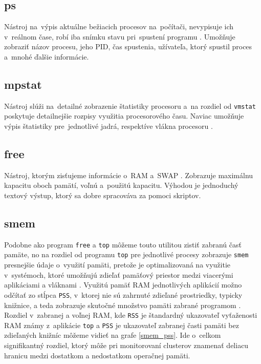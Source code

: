 \subsection*{ps}
Nástroj na~výpis aktuálne bežiacich procesov na~počítači, nevypisuje ich v~reálnom čase, robí iba snímku stavu pri~spustení programu \cite{performance-monitor-book}. Umožňuje zobraziť názov procesu, jeho PID, čas spustenia, užívateľa, ktorý spustil proces a~mnohé ďalšie informácie.

\subsection*{mpstat}
Nástroj slúži na~detailné zobrazenie štatistiky procesoru a~na rozdiel od \texttt{vmstat} poskytuje detailnejšie rozpisy využitia procesorového času. Naviac umožňuje výpis štatistiky pre~jednotlivé jadrá, respektíve vlákna procesoru \cite{text-utils-book}.

\subsection*{free}
Nástroj, ktorým zisťujeme informácie o~RAM a~SWAP \cite{performance-monitor-book}. Zobrazuje maximálnu kapacitu oboch pamätí, voľnú a~použitú kapacitu. Výhodou je jednoduchý textový výstup, ktorý sa dobre spracováva za pomoci skriptov.

\subsection*{smem}
Podobne ako program \texttt{free} a \texttt{top} môžeme touto utilitou zistiť zabranú časť pamäte, no na rozdiel od programu \texttt{top} pre jednotlivé procesy zobrazuje \texttt{smem} presnejšie údaje o~využití pamäti, pretože je optimalizovaná na využitie v~systémoch, ktoré umožňujú zdieľať pamäťový priestor medzi viacerými aplikáciami a vláknami \cite{smem}. Využitú pamäť RAM jednotlivých aplikácií možno odčítať zo stĺpca \texttt{PSS}, v~ktorej nie sú zahrnuté zdieľané prostriedky, typicky knižnice, a teda zobrazuje skutočné množstvo pamäti zabrané programom \cite{smem}. Rozdiel v~zabranej a voľnej RAM, kde \texttt{RSS} je štandardný ukazovateľ vyťaženosti RAM známy z~aplikácie \texttt{top} a \texttt{PSS} je ukazovateľ zabranej časti pamäti bez zdieľaných knižníc môžeme vidieť na grafe \ref{smem_pss}. Ide o~celkom signifikantný rozdiel, ktorý môže pri monitorovaní clusterov znamenať deliacu hranicu medzi dostatkom a nedostatkom operačnej pamäti.

